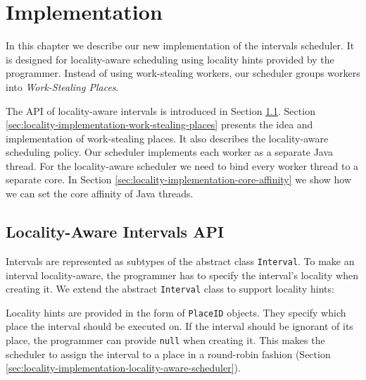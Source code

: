 
\chapter{Implementation}
\label{chap:locality-implementation}

In this chapter we describe our new implementation of the intervals
scheduler. It is designed for locality-aware scheduling using locality
hints provided by the programmer. Instead of using work-stealing
workers, our scheduler groups workers into \emph{Work-Stealing
  Places}.

The API of locality-aware intervals is introduced in Section
\ref{sec:locality-implementation-locality-aware-intervals-api}. Section
\ref{sec:locality-implementation-work-stealing-places} presents the
idea and implementation of work-stealing places. It also describes the
locality-aware scheduling policy. Our scheduler implements each worker
as a separate Java thread. For the locality-aware scheduler we need to
bind every worker thread to a separate core. In Section
\ref{sec:locality-implementation-core-affinity} we show how we can set
the core affinity of Java threads.


\section{Locality-Aware Intervals API}
\label{sec:locality-implementation-locality-aware-intervals-api}

Intervals are represented as subtypes of the abstract class
\lstinline!Interval!. To make an interval locality-aware, the
programmer has to specify the interval's locality when creating it. We
extend the abstract \lstinline!Interval! class to support locality
hints:



Locality hints are provided in the form of \lstinline!PlaceID!
objects. They specify which place the interval should be executed
on. If the interval should be ignorant of its place, the programmer
can provide \lstinline!null! when creating it. This makes the
scheduler to assign the interval to a place in a round-robin fashion
(Section \ref{sec:locality-implementation-locality-aware-scheduler}).

